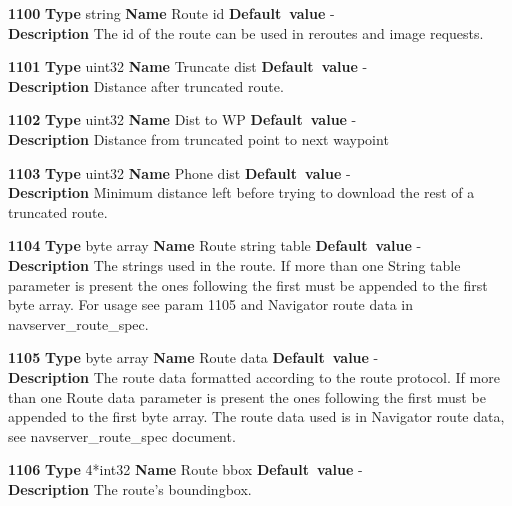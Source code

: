 \documentclass[a4paper]{article}
\begin{document}
\begin{list}{\textbf{ParamID}}{}
\item \textbf{1100} \textbf{Type} string \textbf{Name} Route id
                 \textbf{Default~value} - \\
  \label{Route id}
  \textbf{Description} The id of the route can be used in reroutes and 
  image requests.
\item \textbf{1101} \textbf{Type} uint32 \textbf{Name} Truncate dist
                 \textbf{Default~value} - \\
  \label{Truncate dist}
  \textbf{Description} Distance after truncated route.
\item \textbf{1102} \textbf{Type} uint32 \textbf{Name} Dist to WP
                 \textbf{Default~value} - \\
  \label{Dist to WP}
  \textbf{Description} Distance from truncated point to next waypoint 
\item \textbf{1103} \textbf{Type} uint32 \textbf{Name} Phone dist
                 \textbf{Default~value} - \\
  \label{Phone dist}
  \textbf{Description} Minimum distance left before trying to download the
  rest of a truncated route.
\item \textbf{1104} \textbf{Type} byte array \textbf{Name} Route string table
                 \textbf{Default~value} - \\
  \label{Route string table}
  \textbf{Description} The strings used in the route. If more than one
  String table parameter is present the ones following the first must be
  appended to the first byte array. For usage see param 1105 and Navigator 
  route data in navserver\_route\_spec.
\item \textbf{1105} \textbf{Type} byte array \textbf{Name} Route data
                 \textbf{Default~value} - \\
  \label{Route data}
  \textbf{Description} The route data formatted according to the route 
  protocol. If more than one Route data parameter is present the ones
  following the first must be appended to the first byte array.
  The route data used is in Navigator route data, see 
  navserver\_route\_spec document.
\item \textbf{1106} \textbf{Type} 4*int32 \textbf{Name} Route bbox
                 \textbf{Default~value} - \\
  \label{Route bbox}
  \textbf{Description} The route's boundingbox.


\end{list}
\end{document}
